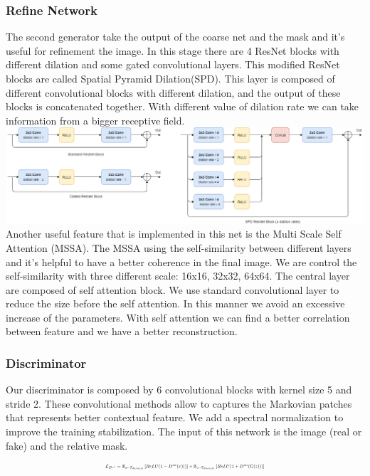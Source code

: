 \documentclass[10pt,twocolumn,letterpaper]{article}
\begin{document}
\subsubsection{Refine Network}
The second generator take the output of the coarse net and the mask and it's useful for refinement the image.
In this stage there are 4 ResNet blocks with different dilation and some gated convolutional layers.
This modified ResNet blocks are called Spatial Pyramid Dilation(SPD). This layer is composed of different convolutional blocks with different dilation, and the output of these blocks is concatenated together. With different value of dilation rate we can take information from a bigger receptive field.
\includegraphics[width=1\linewidth]{img/ResNetSPD.png}
Another useful feature that is implemented in this net is the Multi Scale Self Attention (MSSA). The MSSA using the self-similarity between different layers and it's helpful to have a better coherence in the final image. We are control the self-similarity with three different scale: 16x16, 32x32, 64x64.
The central layer are composed of self attention block. We use standard convolutional layer to reduce the size before the self attention. In this manner we avoid an excessive increase of the parameters. With self attention we can find a better correlation between feature and we have a better reconstruction.
\subsubsection{Discriminator}
Our discriminator is composed by 6 convolutional blocks with kernel size 5 and stride 2.
These convolutional methods allow to captures the Markovian patches that represents better contextual feature\cite{li2016precomputed}.
We add a spectral normalization to improve the training stabilization\cite{miyato2018spectral}.
The input of this network is the image (real or fake) and the relative mask. 
\begin{equation}
    \resizebox{.47 \textwidth}{!}{%
        $\mathcal{L}_{D^{sn}}= \mathbb{E}_{x\sim \mathbb{P}_{data(x)}} \left [ ReLU(1-D^{sn}(x))) \right ] + \mathbb{E}_{z\sim \mathbb{P}_{data(x)}} \left [ ReLU(1+D^{sn}(G(z)))\right ]$%
}   
\end{equation}
\end{document}
